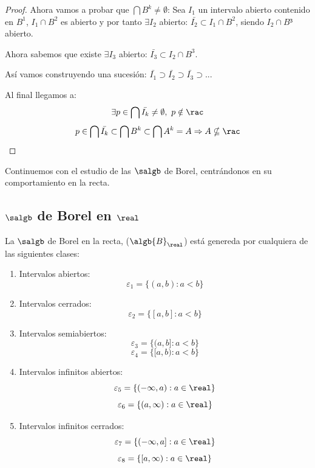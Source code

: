 \documentclass{apuntes}
\begin{document}
\begin{example}
\begin{itemize}
\begin{proof}
Ahora vamos a probar que $\bigcap B^k \neq \emptyset$:
Sea $I_1$ un intervalo abierto contenido en $B^1$, $I_1\cap B^2$ es abierto y por tanto $\exists I_2$ abierto: $\bar{I_2} \subset I_1 \cap B^2$, siendo $I_2 \cap B³$ abierto.

Ahora sabemos que existe $\exists I_3$ abierto: $\bar{I_3} \subset I_2 \cap B^3$.

Así vamos construyendo una sucesión: $\bar{I_1}\supset\bar{I_2}\supset\bar{I_3}\supset...$

Al final llegamos a:
\[\exists p \in \bigcap \bar{I_k} \neq \emptyset, \ p \notin \rac\]
\[p \in \bigcap \bar{I_k} \subset \bigcap B^k \subset \bigcap A^k = A \Rightarrow A\nsubseteq \rac\]

\end{proof}
\end{itemize}
\end{example}

Continuemos con el estudio de las $\salgb$ de Borel, centrándonos en su comportamiento en la recta.

\subsection{$\salgb$ de Borel en $\real$}
\begin{theorem}
La $\salgb$ de Borel en la recta, ($\algb{B}_\real$) está genereda por cualquiera de las siguientes clases:
\begin{enumerate}
\item Intervalos abiertos:
\[\varepsilon_1=\lbrace (a,b): a < b\rbrace\]
\item Intervalos cerrados:
\[\varepsilon_2=\lbrace [a,b]: a < b\rbrace\]
\item Intervalos semiabiertos:
\[\varepsilon_3=\lbrace (a,b]: a < b\rbrace\]
\[\varepsilon_4=\lbrace [a,b): a < b\rbrace\]

\item Intervalos infinitos abiertos:
\[\varepsilon_5=\lbrace (-\infty,a): a \in \real \rbrace\]
\[\varepsilon_6=\lbrace (a, \infty): a \in \real \rbrace\]

\item Intervalos infinitos cerrados:
\[\varepsilon_7=\lbrace (-\infty,a]: a \in \real \rbrace\]
\[\varepsilon_8=\lbrace [a, \infty): a \in \real \rbrace\]
\end{enumerate}
\end{theorem}
\end{document}

